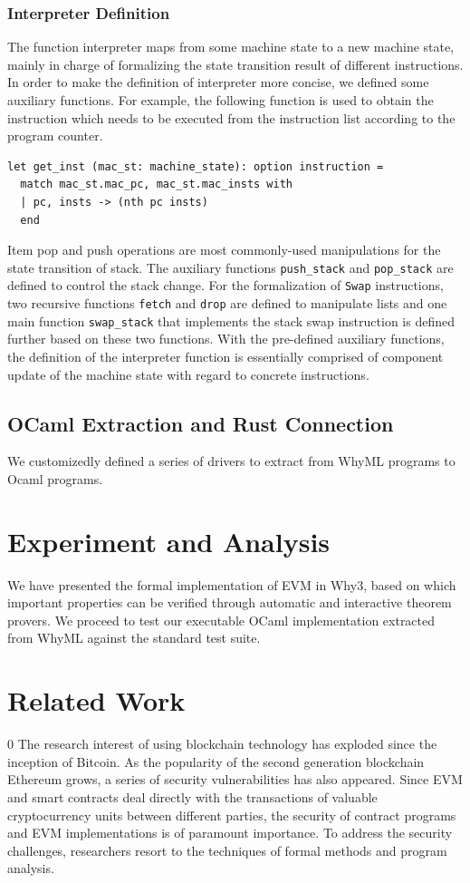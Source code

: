 \documentclass[runningheads]{llncs}
\begin{document}
\subsubsection{Interpreter Definition}
The function interpreter maps from some machine state to a new machine state, mainly in charge of formalizing the state transition result of different instructions.
In order to make the definition of interpreter more concise, we defined some auxiliary functions. For example, the following function is used to obtain the instruction which needs to be executed from the instruction list according to the program counter. 
\begin{verbatim}
let get_inst (mac_st: machine_state): option instruction =
  match mac_st.mac_pc, mac_st.mac_insts with 
  | pc, insts -> (nth pc insts) 
  end    
\end{verbatim}
Item pop and push operations are most commonly-used manipulations for the state transition of stack. The auxiliary functions \texttt{push\_stack} and \texttt{pop\_stack} are defined to control the stack change. For the formalization of \texttt{Swap} instructions, two recursive functions \texttt{fetch} and \texttt{drop} are defined to manipulate lists and one main function \texttt{swap\_stack} that implements the stack swap instruction is defined further based on these two functions.
With the pre-defined auxiliary functions, the definition of the interpreter function is essentially comprised of component update of the machine state with regard to concrete instructions. 


\subsection{OCaml Extraction and Rust Connection}
We customizedly defined a series of drivers to extract from WhyML programs to Ocaml programs. 


\section{Experiment and Analysis}\label{Sec: Experiment}
We have presented the formal implementation of EVM in Why3, based on which important properties can be verified through automatic and interactive theorem provers. We proceed to test our executable OCaml implementation extracted from WhyML against the standard test suite. 
\section{Related Work}\label{Sec: Related}0
The research interest of using blockchain technology has exploded since the inception  of Bitcoin. As the popularity of the second generation blockchain Ethereum grows, a series of security vulnerabilities has also appeared. Since EVM and smart contracts deal directly with the transactions of valuable cryptocurrency units between different parties, the security of contract programs and EVM implementations is of paramount importance. To address the security challenges, researchers resort to the techniques of formal methods and program analysis. 
\end{document}
